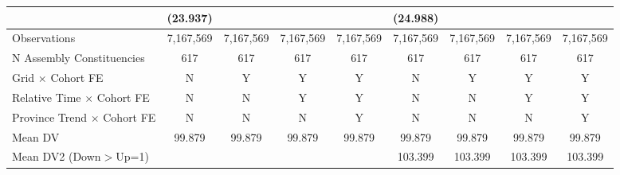 {\begin{tabular}{l*{8}{c}}
            &    (23.937)         &                     &                     &                     &    (24.988)         &                     &                     &                     \\
\hline
Observations&   7,167,569         &   7,167,569         &   7,167,569         &   7,167,569         &   7,167,569         &   7,167,569         &   7,167,569         &   7,167,569         \\
N Assembly Constituencies&         617         &         617         &         617         &         617         &         617         &         617         &         617         &         617         \\
Grid $\times$ Cohort FE&           N         &           Y         &           Y         &           Y         &           N         &           Y         &           Y         &           Y         \\
Relative Time $\times$ Cohort FE&           N         &           N         &           Y         &           Y         &           N         &           N         &           Y         &           Y         \\
Province Trend $\times$ Cohort FE&           N         &           N         &           N         &           Y         &           N         &           N         &           N         &           Y         \\
Mean DV     &      99.879         &      99.879         &      99.879         &      99.879         &      99.879         &      99.879         &      99.879         &      99.879         \\
Mean DV2 (Down$>$Up=1)&                     &                     &                     &                     &     103.399         &     103.399         &     103.399         &     103.399         \\
\hline
\end{tabular}
}
